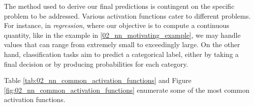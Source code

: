 The method used to derive our final predictions is contingent on the specific problem to be addressed. Various activation functions cater to different problems. For instance, in \emph{regression}, where our objective is to compute a continuous quantity,  like in the example in \headerName{} \ref{02_nn_motivating_example}, we may handle values that can range from extremely small to exceedingly large. On the other hand, classification tasks aim to predict a categorical label, either by taking a final decision or by producing probabilities for each category.


Table \ref{tab:02_nn_common_activation_functions} and Figure \ref{fig:02_nn_common_activation_functions} enumerate some of the most common activation functions.



